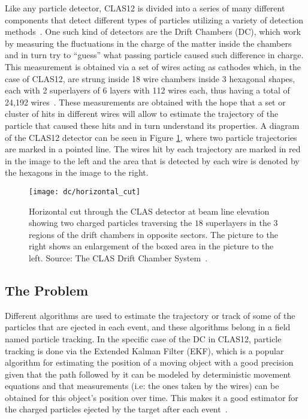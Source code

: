 Like any particle detector, CLAS12 is divided into a series of many different components that detect different types of particles utilizing a variety of detection methods~\cite{pinchoff2005introduction}.
One such kind of detectors are the Drift Chambers (DC), which work by measuring the fluctuations in the charge of the matter inside the chambers and in turn try to ``guess'' what passing particle caused such difference in charge.
This measurement is obtained via a set of wires acting as cathodes which, in the case of CLAS12, are strung inside 18 wire chambers inside 3 hexagonal shapes, each with 2 superlayers of 6 layers with 112 wires each, thus having a total of 24,192 wires~\cite{mestayer2017clas}.
These measurements are obtained with the hope that a set or cluster of hits in different wires will allow to estimate the trajectory of the particle that caused these hits and in turn understand its properties.
A diagram of the CLAS12 detector can be seen in Figure \ref{fig:dc_horizontal_cut}, where two particle trajectories are marked in a pointed line.
The wires hit by each trajectory are marked in red in the image to the left and the area that is detected by each wire is denoted by the hexagons in the image to the right.

    \begin{figure}[ht]
        \centering
        \texttt{[image: dc/horizontal\_cut]}
        \caption{\label{fig:dc_horizontal_cut} Horizontal cut through the CLAS detector at beam line elevation showing two charged particles traversing the $18$ superlayers in the $3$ regions of the drift chambers in opposite sectors. The picture to the right shows an enlargement of the boxed area in the picture to the left. Source: The CLAS Drift Chamber System~\cite{mestayer2000clas}.}
    \end{figure}

\subsection{The Problem} \label{ssec:prob_the_problem}
Different algorithms are used to estimate the trajectory or track of some of the particles that are ejected in each event, and these algorithms belong in a field named particle tracking.
In the specific case of the DC in CLAS12, particle tracking is done via the Extended Kalman Filter (EKF), which is a popular algorithm for estimating the position of a moving object with a good precision given that the path followed by it can be modeled by deterministic movement equations and that measurements (i.e: the ones taken by the wires) can be obtained for this object's position over time.
This makes it a good estimator for the charged particles ejected by the target after each event~\cite{kalman1960new}.


